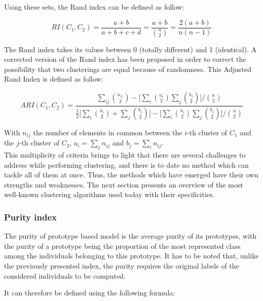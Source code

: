     Using these sets, the Rand index can be defined as follow:

    \begin{equation}
        RI(C_1, C_2) = \frac{a + b}{a + b + c + d} = \frac{a + b}{\binom{n}{2}} = \frac{2(a + b)}{n(n-1)}
        \label{eq:rand_index}
    \end{equation}

    The Rand index takes its values between 0 (totally different) and 1 (identical). A corrected version of the Rand index has been proposed in order to correct the possibility that two clusterings are equal because of randomness. This Adjusted Rand Index is defined as follow:

    \begin{equation}
        ARI(C_1, C_2) = \frac{\sum_{ij}\binom{n_{ij}}{2} - \big[\sum_i\binom{a_i}{2}\sum_j\binom{b_j}{2}\big]/\binom{n}{2}}{\frac{1}{2}\big[\sum_i\binom{a_i}{2} + \sum_j\binom{b_j}{2}\big] - \big[\sum_i\binom{a_i}{2}\sum_j\binom{b_j}{2}\big]/\binom{n}{2}}
        \label{eq:adj_rand_index}
    \end{equation}

    With $n_{ij}$ the number of elements in common between the $i$-th cluster of $C_1$ and the $j$-th cluster of $C_2$, $a_i = \sum_j n_{ij}$ and $b_j = \sum_i n_{ij}$.\\

    This multiplicity of criteria brings to light that there are several challenges to address while performing clustering, and there is to date no method which can tackle all of them at once. Thus, the methods which have emerged have their own strengths and weaknesses. The next section presents an overview of the most well-known clustering algorithms used today with their specificities.


    \subsubsection{Purity index}
    \label{survey_purity}

    The purity of prototype based model is the average purity of its prototypes, 
    with the purity of a prototype being the proportion of the most represented 
    class among the individuals belonging to this prototype. It has to be noted 
    that, unlike the previously presented index, the purity requires the 
    original labels of the considered individuals to be computed.

    It can therefore be defined using the following formula:

